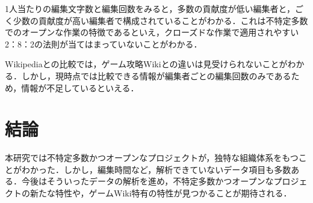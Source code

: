 \documentclass[uplatex,twocolumn,dvipdfmx]{jsarticle}
\begin{document}
1人当たりの編集文字数と編集回数をみると，多数の貢献度が低い編集者と，ごく少数の貢献度が高い編集者で構成されていることがわかる．これは不特定多数でのオープンな作業の特徴であるといえ，クローズドな作業で適用されやすい2：8：2の法則が当てはまっていないことがわかる．

Wikipediaとの比較では，ゲーム攻略Wikiとの違いは見受けられないことがわかる．しかし，現時点では比較できる情報が編集者ごとの編集回数のみであるため，情報が不足しているといえる．

\section{結論}

本研究では不特定多数かつオープンなプロジェクトが，独特な組織体系をもつことがわかった．しかし，編集時間など，解析できていないデータ項目も多数ある．今後はそういったデータの解析を進め，不特定多数かつオープンなプロジェクトの新たな特性や，ゲームWiki特有の特性が見つかることが期待される．


\end{document}

